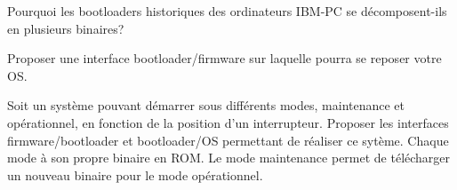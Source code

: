 \begin{questions}
\begin{parts}
\begin{subparts}
    \subpart Pourquoi les bootloaders historiques des ordinateurs IBM-PC se décomposent-ils en plusieurs binaires?

    \subpart Proposer une interface bootloader/firmware sur laquelle pourra se reposer votre OS.
  \end{subparts}

  \bonuspart[1]
Soit un système pouvant démarrer sous différents modes, maintenance et opérationnel, en fonction de la position d'un interrupteur. Proposer les interfaces firmware/bootloader et bootloader/OS permettant de réaliser ce sytème. Chaque mode à son propre binaire en ROM. Le mode maintenance permet de télécharger un nouveau binaire pour le mode opérationnel.
\end{parts}

%
%


%
%

\end{questions}
